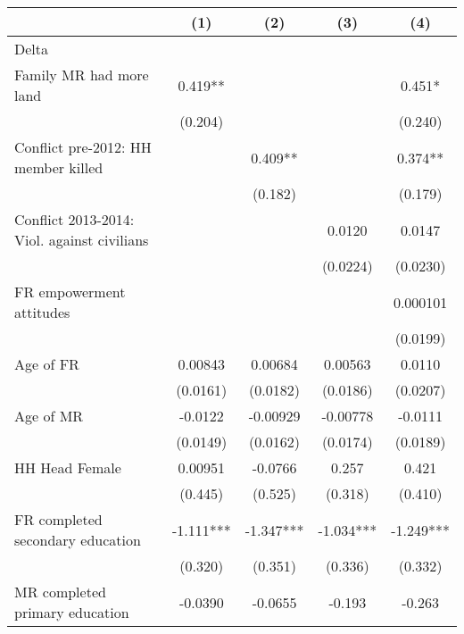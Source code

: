 {
\def\sym#1{\ifmmode^{#1}\else\(^{#1}\)\fi}
\begin{tabular}{l*{4}{c}}
\hline\hline
                    &\multicolumn{1}{c}{(1)}   &\multicolumn{1}{c}{(2)}   &\multicolumn{1}{c}{(3)}   &\multicolumn{1}{c}{(4)}   \\
\hline
Delta               &               &               &               &               \\
Family MR had more land&       0.419** &               &               &       0.451*  \\
                    &     (0.204)   &               &               &     (0.240)   \\
[1em]
Conflict pre-2012: HH member killed&               &       0.409** &               &       0.374** \\
                    &               &     (0.182)   &               &     (0.179)   \\
[1em]
Conflict 2013-2014: Viol. against civilians&               &               &      0.0120   &      0.0147   \\
                    &               &               &    (0.0224)   &    (0.0230)   \\
[1em]
FR empowerment attitudes&               &               &               &    0.000101   \\
                    &               &               &               &    (0.0199)   \\
[1em]
Age of FR           &     0.00843   &     0.00684   &     0.00563   &      0.0110   \\
                    &    (0.0161)   &    (0.0182)   &    (0.0186)   &    (0.0207)   \\
[1em]
Age of MR           &     -0.0122   &    -0.00929   &    -0.00778   &     -0.0111   \\
                    &    (0.0149)   &    (0.0162)   &    (0.0174)   &    (0.0189)   \\
[1em]
HH Head Female      &     0.00951   &     -0.0766   &       0.257   &       0.421   \\
                    &     (0.445)   &     (0.525)   &     (0.318)   &     (0.410)   \\
[1em]
FR completed secondary education&      -1.111***&      -1.347***&      -1.034***&      -1.249***\\
                    &     (0.320)   &     (0.351)   &     (0.336)   &     (0.332)   \\
[1em]
MR completed primary education&     -0.0390   &     -0.0655   &      -0.193   &      -0.263   \\

\end{tabular}}
